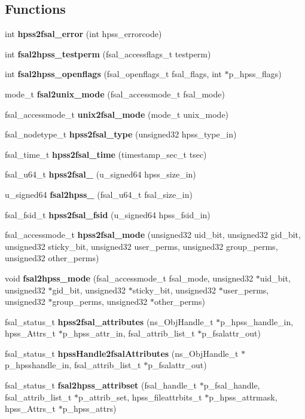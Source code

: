 \subsection*{Functions}
\begin{CompactItemize}
\item 
int {\bf hpss2fsal\_\-error} (int hpss\_\-errorcode)
\item 
int {\bf fsal2hpss\_\-testperm} (fsal\_\-accessflags\_\-t testperm)
\item 
int {\bf fsal2hpss\_\-openflags} (fsal\_\-openflags\_\-t fsal\_\-flags, int $\ast$p\_\-hpss\_\-flags)
\item 
mode\_\-t {\bf fsal2unix\_\-mode} (fsal\_\-accessmode\_\-t fsal\_\-mode)
\item 
fsal\_\-accessmode\_\-t {\bf unix2fsal\_\-mode} (mode\_\-t unix\_\-mode)
\item 
fsal\_\-nodetype\_\-t {\bf hpss2fsal\_\-type} (unsigned32 hpss\_\-type\_\-in)
\item 
fsal\_\-time\_\-t {\bf hpss2fsal\_\-time} (timestamp\_\-sec\_\-t tsec)
\item 
fsal\_\-u64\_\-t {\bf hpss2fsal\_} (u\_\-signed64 hpss\_\-size\_\-in)
\item 
u\_\-signed64 {\bf fsal2hpss\_} (fsal\_\-u64\_\-t fsal\_\-size\_\-in)
\item 
fsal\_\-fsid\_\-t {\bf hpss2fsal\_\-fsid} (u\_\-signed64 hpss\_\-fsid\_\-in)
\item 
fsal\_\-accessmode\_\-t {\bf hpss2fsal\_\-mode} (unsigned32 uid\_\-bit, unsigned32 gid\_\-bit, unsigned32 sticky\_\-bit, unsigned32 user\_\-perms, unsigned32 group\_\-perms, unsigned32 other\_\-perms)
\item 
void {\bf fsal2hpss\_\-mode} (fsal\_\-accessmode\_\-t fsal\_\-mode, unsigned32 $\ast$uid\_\-bit, unsigned32 $\ast$gid\_\-bit, unsigned32 $\ast$sticky\_\-bit, unsigned32 $\ast$user\_\-perms, unsigned32 $\ast$group\_\-perms, unsigned32 $\ast$other\_\-perms)
\item 
fsal\_\-status\_\-t {\bf hpss2fsal\_\-attributes} (ns\_\-ObjHandle\_\-t $\ast$p\_\-hpss\_\-handle\_\-in, hpss\_\-Attrs\_\-t $\ast$p\_\-hpss\_\-attr\_\-in, fsal\_\-attrib\_\-list\_\-t $\ast$p\_\-fsalattr\_\-out)
\item 
fsal\_\-status\_\-t {\bf hpssHandle2fsalAttributes} (ns\_\-ObjHandle\_\-t $\ast$p\_\-hpsshandle\_\-in, fsal\_\-attrib\_\-list\_\-t $\ast$p\_\-fsalattr\_\-out)
\item 
fsal\_\-status\_\-t {\bf fsal2hpss\_\-attribset} (fsal\_\-handle\_\-t $\ast$p\_\-fsal\_\-handle, fsal\_\-attrib\_\-list\_\-t $\ast$p\_\-attrib\_\-set, hpss\_\-fileattrbits\_\-t $\ast$p\_\-hpss\_\-attrmask, hpss\_\-Attrs\_\-t $\ast$p\_\-hpss\_\-attrs)
\end{CompactItemize}



